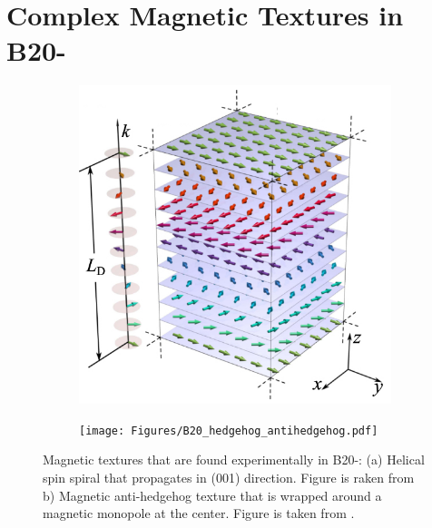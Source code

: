 \documentclass [a4paper, 12pt]{article}
\begin{document}
\section{Complex Magnetic Textures in B20-}
\label{sec:mnge}
\begin{figure}[h]
\centering
\begin{subfigure}[b]{0.49\textwidth}
   \includegraphics[width=\textwidth]{Figures/helicalspiral.png}
   \caption{}
   \label{fig:mnge_spiral}
\end{subfigure}
\begin{subfigure}[b]{0.49\textwidth}
	\texttt{[image: Figures/B20\_hedgehog\_antihedgehog.pdf]}
   \caption{}
   \label{fig:mnge_3q}
\end{subfigure}
	\caption{Magnetic textures that are found experimentally in B20-:  (a) Helical
	spin spiral that propagates in (001) direction. Figure is raken from \cite{rybakov_new_2016} b) 
	Magnetic anti-hedgehog texture that is wrapped around a magnetic monopole at the center.
	Figure is taken from \cite{zhang_electric_2016}.}
\label{fig:mnge_spiral_and_3q}
\end{figure}
\end{document}
